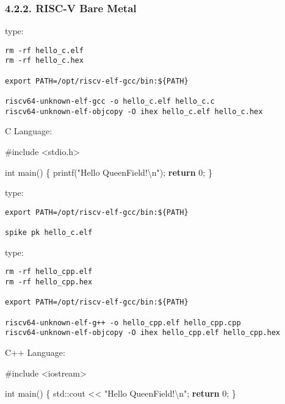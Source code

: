 \documentclass[]{article}
\newenvironment{Shaded}{}{}
\newcommand{\BuiltInTok}[1]{#1}
\newcommand{\ControlFlowTok}[1]{\textcolor[rgb]{0.00,0.44,0.13}{\textbf{#1}}}
\newcommand{\DataTypeTok}[1]{\textcolor[rgb]{0.56,0.13,0.00}{#1}}
\newcommand{\DecValTok}[1]{\textcolor[rgb]{0.25,0.63,0.44}{#1}}
\newcommand{\ImportTok}[1]{#1}
\newcommand{\NormalTok}[1]{#1}
\newcommand{\PreprocessorTok}[1]{\textcolor[rgb]{0.74,0.48,0.00}{#1}}
\newcommand{\SpecialCharTok}[1]{\textcolor[rgb]{0.25,0.44,0.63}{#1}}
\newcommand{\StringTok}[1]{\textcolor[rgb]{0.25,0.44,0.63}{#1}}
\begin{document}
\hypertarget{risc-v-bare-metal}{%
\subsubsection{4.2.2. RISC-V Bare Metal}\label{risc-v-bare-metal}}

type:

\begin{verbatim}
rm -rf hello_c.elf
rm -rf hello_c.hex

export PATH=/opt/riscv-elf-gcc/bin:${PATH}

riscv64-unknown-elf-gcc -o hello_c.elf hello_c.c
riscv64-unknown-elf-objcopy -O ihex hello_c.elf hello_c.hex
\end{verbatim}

C Language:

\begin{Shaded}
\begin{Highlighting}[]
\PreprocessorTok{#include }\ImportTok{<stdio.h>}

\DataTypeTok{int}\NormalTok{ main() \{}
\NormalTok{  printf(}\StringTok{"Hello QueenField!}\SpecialCharTok{\textbackslash{}n}\StringTok{"}\NormalTok{);}
  \ControlFlowTok{return} \DecValTok{0}\NormalTok{;}
\NormalTok{\}}
\end{Highlighting}
\end{Shaded}

type:

\begin{verbatim}
export PATH=/opt/riscv-elf-gcc/bin:${PATH}

spike pk hello_c.elf
\end{verbatim}

type:

\begin{verbatim}
rm -rf hello_cpp.elf
rm -rf hello_cpp.hex

export PATH=/opt/riscv-elf-gcc/bin:${PATH}

riscv64-unknown-elf-g++ -o hello_cpp.elf hello_cpp.cpp
riscv64-unknown-elf-objcopy -O ihex hello_cpp.elf hello_cpp.hex
\end{verbatim}

C++ Language:

\begin{Shaded}
\begin{Highlighting}[]
\PreprocessorTok{#include }\ImportTok{<iostream>}

\DataTypeTok{int}\NormalTok{ main() \{}
  \BuiltInTok{std::}\NormalTok{cout << }\StringTok{"Hello QueenField!}\SpecialCharTok{\textbackslash{}n}\StringTok{"}\NormalTok{;}
  \ControlFlowTok{return} \DecValTok{0}\NormalTok{;}
\NormalTok{\}}
\end{Highlighting}
\end{Shaded}
\end{document}
